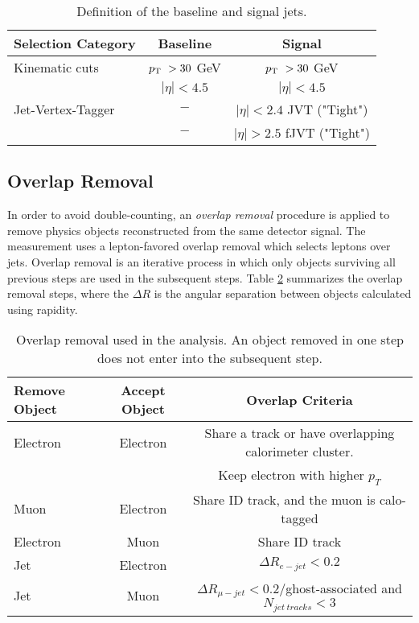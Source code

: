\begin{table}[!htbp]
    \centering
    \caption{Definition of the baseline and signal jets.\label{tab:jets}}
        \begin{tabular}{|| l || c | c ||}
        \hline
        Selection Category & \textbf{Baseline} & \textbf{Signal} \\
        \hline\hline
        Kinematic cuts & $p_{\textrm{T} ~} > 30$ GeV & $p_{\textrm{T} ~} > 30$ GeV \\
             & $|\eta| < 4.5$ & $|\eta| < 4.5$\\
        \hline
        Jet-Vertex-Tagger & $-$ & $ |\eta| < 2.4 $ JVT ("Tight")\\
                & $-$ & $|\eta| > 2.5 $ fJVT ("Tight")\\
        \hline
    \end{tabular}
\end{table}

\subsection{Overlap Removal}
\label{subsec:OR}

In order to avoid double-counting, an \textit{overlap removal} procedure is applied to remove physics objects reconstructed from the same detector signal. The measurement uses a lepton-favored overlap removal which selects leptons over jets. Overlap removal is an iterative process in which only objects surviving all previous steps are used in the subsequent steps. Table \ref{tab:overlap_removal} summarizes the overlap removal steps, where the $\Delta R$ is the angular separation between objects calculated using rapidity.

\begin{table}[!htbp]
    \centering
        \caption{Overlap removal used in the analysis. An object removed in one step does not enter into the subsequent step. \label{tab:overlap_removal}}
        \begin{tabular}{|| l || c | c ||}
        \hline
        Remove Object & Accept Object & Overlap Criteria \\
        \hline\hline
        Electron & Electron & Share a track or have overlapping calorimeter cluster.\\
                &       & Keep electron with higher $p_{T}$\\
        \hline
        Muon & Electron & Share ID track, and the muon is calo-tagged\\
        \hline
        Electron & Muon & Share ID track\\
        \hline
        Jet & Electron & $\Delta R_{e-jet} < 0.2$ \\
        \hline 
        Jet & Muon & $\Delta R_{\mu-jet} < 0.2/$ghost-associated and $N_{jet~tracks} < 3$\\
        \hline
    \end{tabular}
\end{table}